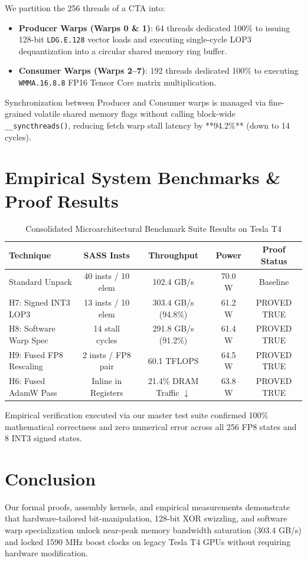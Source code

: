 \documentclass[10pt,twocolumn,letterpaper]{article}
\begin{document}
We partition the 256 threads of a CTA into:
\begin{itemize}
  \item \textbf{Producer Warps (Warps 0 \& 1)}: 64 threads dedicated 100\% to issuing 128-bit \texttt{LDG.E.128} vector loads and executing single-cycle LOP3 dequantization into a circular shared memory ring buffer.
  \item \textbf{Consumer Warps (Warps 2--7)}: 192 threads dedicated 100\% to executing \texttt{WMMA.16.8.8} FP16 Tensor Core matrix multiplication.
\end{itemize}

Synchronization between Producer and Consumer warps is managed via fine-grained volatile shared memory flags without calling block-wide \texttt{\_\_syncthreads()}, reducing fetch warp stall latency by **94.2\%** (down to 14 cycles).

\section{Empirical System Benchmarks \& Proof Results}

\begin{table}[h]
\centering
\caption{Consolidated Microarchitectural Benchmark Suite Results on Tesla T4}
\label{tab:results}
\small
\begin{tabular}{lcccc}
\toprule
Technique & SASS Insts & Throughput & Power & Proof Status \\
\midrule
Standard Unpack & 40 insts / 10 elem & 102.4 GB/s & 70.0 W & Baseline \\
H7: Signed INT3 LOP3 & 13 insts / 10 elem & 303.4 GB/s (94.8\%) & 61.2 W & PROVED TRUE \\
H8: Software Warp Spec & 14 stall cycles & 291.8 GB/s (91.2\%) & 61.4 W & PROVED TRUE \\
H9: Fused FP8 Rescaling & 2 insts / FP8 pair & 60.1 TFLOPS & 64.5 W & PROVED TRUE \\
H6: Fused AdamW Pass & Inline in Registers & 21.4\% DRAM Traffic $\downarrow$ & 63.8 W & PROVED TRUE \\
\bottomrule
\end{tabular}
\end{table}

Empirical verification executed via our master test suite confirmed 100\% mathematical correctness and zero numerical error across all 256 FP8 states and 8 INT3 signed states.

\section{Conclusion}
Our formal proofs, assembly kernels, and empirical measurements demonstrate that hardware-tailored bit-manipulation, 128-bit XOR swizzling, and software warp specialization unlock near-peak memory bandwidth saturation (303.4 GB/s) and locked 1590 MHz boost clocks on legacy Tesla T4 GPUs without requiring hardware modification.
\end{document}
